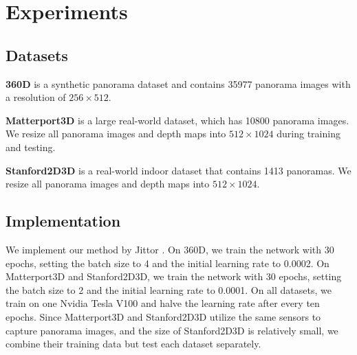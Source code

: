 \section{Experiments}
\label{sec:experiment}


\subsection{Datasets}


\textbf{360D} \cite{zioulis2018omnidepth} is a synthetic panorama dataset and contains 35977 panorama images with a resolution of $256 \times 512$. 

\noindent \textbf{Matterport3D} \cite{chang2017matterport3d} is a large real-world dataset, which has 10800 panorama images. We resize all panorama images and depth maps into $512 \times 1024$ during training and testing.

\noindent \textbf{Stanford2D3D} \cite{armeni2017joint} is a real-world indoor dataset that contains 1413 panoramas. We resize all panorama images and depth maps into $512 \times 1024$. 



\subsection{Implementation}

We implement our method by Jittor \cite{hu2020jittor}.
On 360D, we train the network with 30 epochs, setting the batch size to 4 and the initial learning rate to 0.0002. 
On Matterport3D and Stanford2D3D, we train the network with 30 epochs, setting the batch size to 2 and the initial learning rate to 0.0001. 
On all datasets, we train on one Nvidia Tesla V100 and halve the learning rate after every ten epochs. 
Since Matterport3D and Stanford2D3D utilize the same sensors to capture panorama images, and the size of Stanford2D3D is relatively small, we combine their training data but test each dataset separately.




